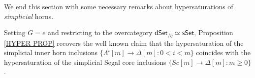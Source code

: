 \documentclass[a4paper,10pt
,draft
]{article}%
\begin{document}
%

We end this section with some necessary remarks about hypersaturations of \textit{simplicial} horns.


\begin{remark}\label{SLICE REM}
	Setting $G=e$ and restricting to the overcategory
	$\mathsf{dSet}_{/\eta} \simeq \mathsf{sSet}$,
	Proposition \ref{HYPER PROP}
	recovers the well known claim that 
	the hypersaturation of the simplicial inner horn inclusions
	$\{\Lambda^i[m] \to \Delta[m] \colon 0< i < m\}$
	coincides with the hypersaturation of the simplicial Segal core inclusions
	$\{Sc[m] \to \Delta[m]\colon m \geq 0\}$.
\end{remark}
\end{document}
